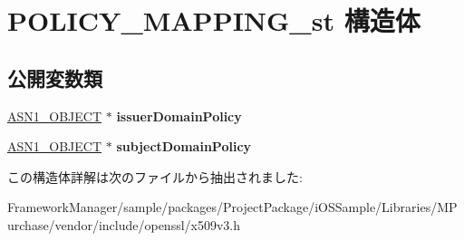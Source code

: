 \hypertarget{struct_p_o_l_i_c_y___m_a_p_p_i_n_g__st}{}\section{P\+O\+L\+I\+C\+Y\+\_\+\+M\+A\+P\+P\+I\+N\+G\+\_\+st 構造体}
\label{struct_p_o_l_i_c_y___m_a_p_p_i_n_g__st}
\subsection*{公開変数類}
\begin{DoxyCompactItemize}
\item 
\hypertarget{struct_p_o_l_i_c_y___m_a_p_p_i_n_g__st_a426cb055da517faf080f42de138bead3}{}\hyperlink{structasn1__object__st}{A\+S\+N1\+\_\+\+O\+B\+J\+E\+C\+T} $\ast$ {\bfseries issuer\+Domain\+Policy}\label{struct_p_o_l_i_c_y___m_a_p_p_i_n_g__st_a426cb055da517faf080f42de138bead3}

\item 
\hypertarget{struct_p_o_l_i_c_y___m_a_p_p_i_n_g__st_ad397a2367d90e97217ee96ff07ee5604}{}\hyperlink{structasn1__object__st}{A\+S\+N1\+\_\+\+O\+B\+J\+E\+C\+T} $\ast$ {\bfseries subject\+Domain\+Policy}\label{struct_p_o_l_i_c_y___m_a_p_p_i_n_g__st_ad397a2367d90e97217ee96ff07ee5604}

\end{DoxyCompactItemize}


この構造体詳解は次のファイルから抽出されました\+:\begin{DoxyCompactItemize}
\item 
Framework\+Manager/sample/packages/\+Project\+Package/i\+O\+S\+Sample/\+Libraries/\+M\+Purchase/vendor/include/openssl/x509v3.\+h\end{DoxyCompactItemize}

